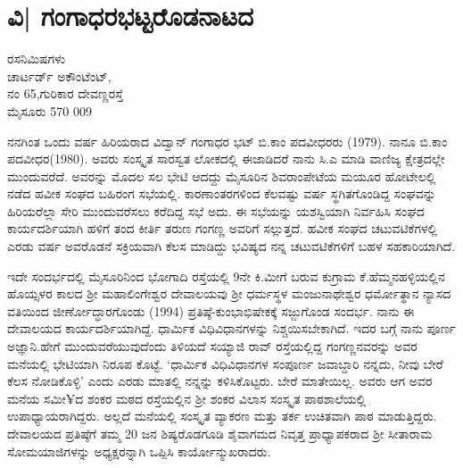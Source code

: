 \chapter{ವಿ| ಗಂಗಾಧರಭಟ್ಟರೊಡನಾಟದ} 

\begin{center}
\smallskip

ರಸನಿಮಿಷಗಳು\\
ಚಾರ್ಟರ್ಡ್ ಅಕೌಂಟೆಂಟ್,\\ 
ನಂ 65,ಗುರಿಕಾರ ದೇವಣ್ಣರಸ್ತೆ\\
ಮೈಸೂರು 570 009 
\end{center}

ನನಗಿಂತ ಒಂದು ವರ್ಷ ಹಿರಿಯರಾದ ವಿದ್ವಾನ್ ಗಂಗಾಧರ ಭಟ್ ಬಿ.ಕಾಂ ಪದವೀಧರರು (1979). ನಾನೂ ಬಿ.ಕಾಂ ಪದವೀಧರ(1980). ಅವರು ಸಂಸ್ಕೃತ ಸಾರಸ್ವತ ಲೋಕದಲ್ಲಿ ಈಜಾಡಿದರೆ ನಾನು ಸಿ.ಎ ಮಾಡಿ ವಾಣಿಜ್ಯ ಕ್ಷೇತ್ರದಲ್ಲೇ ಮುಂದುವರೆದೆ. ಅವರನ್ನು ಮೊದಲ ಸಲ ಭೇಟಿ ಆದದ್ದು ಮೈಸೂರಿನ ಶಿವರಾಂಪೇಟೆಯ ಮಯೂರ ಹೋಟೇಲಲ್ಲಿ ನಡೆದ ಹವೀಕ ಸಂಘದ ಬಹಿರಂಗ ಸಭೆಯಲ್ಲಿ. ಕಾರಣಾಂತರಗಳಿಂದ ಕೆಲವಷ್ಟು ವರ್ಷ ಸ್ಥಗಿತಗೊಂಡಿದ್ದ ಸಂಘವನ್ನು ಹಿರಿಯರೆಲ್ಲಾ ಸೇರಿ ಮುಂದುವರೆಸಲು ಕರೆದಿದ್ದ ಸಭೆ ಅದು. ಈ ಸಭೆಯನ್ನು ಯಶಸ್ವಿಯಾಗಿ ನಿರ್ವಹಿಸಿ ಸಂಘದ ಕಾರ್ಯದರ್ಶಿಯಾಗಿ ಹಳಿಗೆ ತಂದ ಕೀರ್ತಿ ತರುಣ ಗಂಗಣ್ಣ ಅವರಿಗೆ ಸಲ್ಲುತ್ತದೆ. ಹವೀಕ ಸಂಘದ ಚಟುವಟಿಕೆಗಳಲ್ಲಿ ಎರಡು ವರ್ಷ ಅವರೊಡನೆ ಸಕ್ರಿಯವಾಗಿ ಕೆಲಸ ಮಾಡಿದ್ದು ಭವಿಷ್ಯದ ನನ್ನ ಚಟುವಟಿಕೆಗಳಿಗೆ ಬಹಳ ಸಹಕಾರಿಯಾಗಿದೆ.

ಇದೇ ಸಂದರ್ಭದಲ್ಲಿ ಮೈಸೂರಿನಿಂದ ಭೋಗಾದಿ ರಸ್ತೆಯಲ್ಲಿ 9ನೇ ಕಿ.ಮೀಗೆ ಬರುವ ಕುಗ್ರಾಮ ಕೆ.ಹೆಮ್ಮನಹಳ್ಳಿಯಲ್ಲಿನ ಹೊಯ್ಸಳರ ಕಾಲದ ಶ್ರೀ ಮಹಾಲಿಂಗೇಶ್ವರ ದೇವಾಲಯವು ಶ್ರೀ ಧರ್ಮಸ್ಥಳ ಮಂಜುನಾಥೇಶ್ವರ ಧರ್ಮೋತ್ಥಾನ ನ್ಯಾಸದ ವತಿಯಿಂದ ಜೀರ್ಣೋದ್ಧಾರಗೊಂಡು (1994)    ಪ್ರತಿಷ್ಠೆ-ಕುಂಭಾಭಿಷೇಕಕ್ಕೆ ಸಜ್ಜುಗೊಂಡ ಸಂದರ್ಭ. ನಾನು ಈ ದೇವಾಲಯದ ಕಾರ್ಯದರ್ಶಿಯಾಗಿದ್ದೆ. ಧಾರ್ಮಿಕ ವಿಧಿವಿಧಾನಗಳನ್ನು  ನಿಶ್ಚಯಿಸಬೇಕಾಗಿದೆ. ಇದರ ಬಗ್ಗೆ ನಾನು ಪೂರ್ಣ ಅಜ್ಞಾನಿ.ಹೇಗೆ ಮುಂದುವರೆಯುವುದೆಂದು ತಿಳಿಯದೆ ಸಯ್ಯಾಜಿ ರಾವ್ ರಸ್ತೆಯಲ್ಲಿದ್ದ ಗಂಗಣ್ಣನವರನ್ನು ಅವರ ಮನೆಯಲ್ಲಿ ಭೇಟಿಯಾಗಿ ನಿರೂಪ ಕೊಟ್ಟೆ.  ‘ಧಾರ್ಮಿಕ ವಿಧಿವಿಧಾನಗಳ ಸಂಪೂರ್ಣ  ಜವಾಬ್ದಾರಿ ನನ್ನದು, ನೀವು ಬೇರೆ ಕೆಲಸ ನೋಡಿಕೊಳ್ಳಿ’  ಎಂದು ಎರಡು ಮಾತಲ್ಲಿ ನನ್ನನ್ನು ಕಳಿಸಿಕೊಟ್ಟರು. ಬೇರೆ ಮಾತೇಯಿಲ್ಲ. ಅವರು ಆಗ ಅವರ ಮನೆಯ ಸಮೀ¥ದ ಶಂಕರ ಮಠದ ರಸ್ತೆಯಲ್ಲಿನ ಶ್ರೀ ಶಂಕರ ವಿಲಾಸ ಸಂಸ್ಕೃತ ಪಾಠಶಾಲೆಯಲ್ಲಿ ಉಪಾಧ್ಯಾಯರಾಗಿದ್ದರು. ಅಲ್ಲದೆ ಮನೆಯಲ್ಲಿ ಸಂಸ್ಕೃತ ವ್ಯಾಕರಣ ಮತ್ತು ತರ್ಕ ಉಚಿತವಾಗಿ ಪಾಠ ಮಾಡುತ್ತಿದ್ದರು. ದೇವಾಲಯದ ಪ್ರತಿಷ್ಠೆಗೆ ತಮ್ಮ 20 ಜನ ಶಿಷ್ಯರೊಡಗೂಡಿ ಶೈವಾಗಮದ  ನಿವೃತ್ತ ಪ್ರಾಧ್ಯಾಪಕರಾದ ಶ್ರೀ ಸೀತಾರಾಮ ಸೋಮಯಾಜಿಗಳನ್ನು ಅಧ್ಯಕ್ಷರನ್ನಾಗಿ ಒಪ್ಪಿಸಿ ಕಾರ್ಯೋನ್ಮುಖರಾದರು. 

